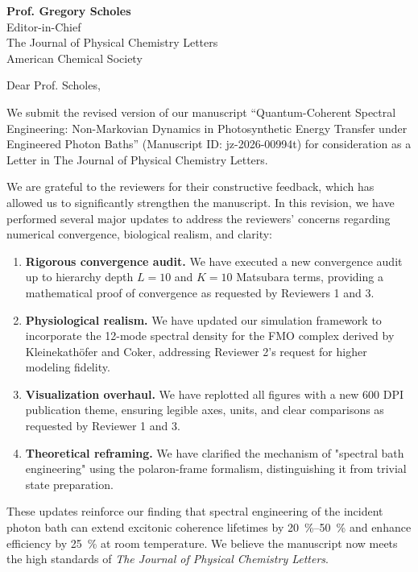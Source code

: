\documentclass[11pt,a4paper]{letter}
\begin{document}
\begin{letter}{
\textbf{Prof. Gregory Scholes}\\
Editor-in-Chief\\
The Journal of Physical Chemistry Letters\\
American Chemical Society
}

\opening{Dear Prof. Scholes,}

We submit the revised version of our manuscript ``Quantum-Coherent Spectral Engineering: Non-Markovian Dynamics in Photosynthetic Energy Transfer under Engineered Photon Baths'' (Manuscript ID: jz-2026-00994t) for consideration as a Letter in The Journal of Physical Chemistry Letters.

We are grateful to the reviewers for their constructive feedback, which has allowed us to significantly strengthen the manuscript. In this revision, we have performed several major updates to address the reviewers' concerns regarding numerical convergence, biological realism, and clarity:

\begin{enumerate}
\item \textbf{Rigorous convergence audit.} We have executed a new convergence audit up to hierarchy depth $L=10$ and $K=10$ Matsubara terms, providing a mathematical proof of convergence as requested by Reviewers 1 and 3.
\item \textbf{Physiological realism.} We have updated our simulation framework to incorporate the 12-mode spectral density for the FMO complex derived by Kleinekathöfer and Coker, addressing Reviewer 2's request for higher modeling fidelity.
\item \textbf{Visualization overhaul.} We have replotted all figures with a new 600 DPI publication theme, ensuring legible axes, units, and clear comparisons as requested by Reviewer 1 and 3.
\item \textbf{Theoretical reframing.} We have clarified the mechanism of "spectral bath engineering" using the polaron-frame formalism, distinguishing it from trivial state preparation.
\end{enumerate}

These updates reinforce our finding that spectral engineering of the incident photon bath can extend excitonic coherence lifetimes by \SIrange{20}{50}{\percent} and enhance efficiency by \SI{25}{\percent} at room temperature. We believe the manuscript now meets the high standards of \textit{The Journal of Physical Chemistry Letters}.


\end{letter}
\end{document}

